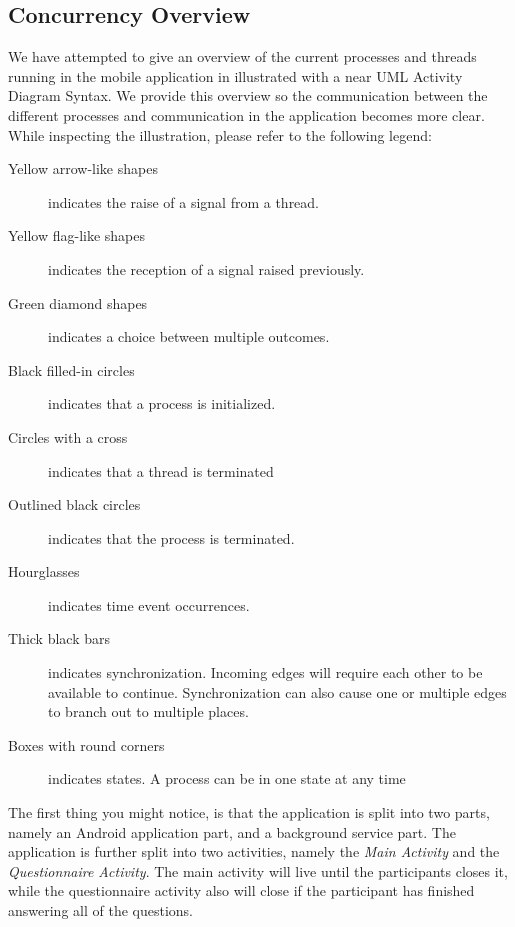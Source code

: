 \subsection{Concurrency Overview}
We have attempted to give an overview of the current processes and threads running in the mobile application in  illustrated with a near UML Activity Diagram Syntax. We provide this overview so the communication between the different processes and communication in the application becomes more clear. While inspecting the illustration, please refer to the following legend:

\begin{description}
	\item[Yellow arrow-like shapes] indicates the raise of a signal from a thread.

	\item[Yellow flag-like shapes] indicates the reception of a signal raised previously.

	\item[Green diamond shapes] indicates a choice between multiple outcomes. 

	\item[Black filled-in circles] indicates that a process is initialized. 

	\item[Circles with a cross] indicates that a thread is terminated

	\item[Outlined black circles] indicates that the process is terminated.

	\item[Hourglasses] indicates time event occurrences.

	\item[Thick black bars] indicates synchronization. Incoming edges will require each other to be available to continue. Synchronization can also cause one or multiple edges to branch out to multiple places.

	\item[Boxes with round corners] indicates states. A process can be in one state at any time
\end{description}


The first thing you might notice, is that the application is split into two parts, namely an Android application part, and a background service part. The application is further split into two activities, namely the \emph{Main Activity} and the \emph{Questionnaire Activity}. The main activity will live until the participants closes it, while the questionnaire activity also will close if the participant has finished answering all of the questions.

